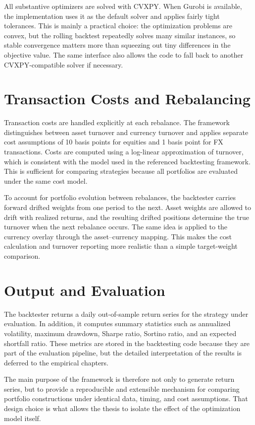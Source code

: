 All substantive optimizers are solved with CVXPY. When Gurobi is available, the implementation uses it as the default solver and applies fairly tight tolerances. This is mainly a practical choice: the optimization problems are convex, but the rolling backtest repeatedly solves many similar instances, so stable convergence matters more than squeezing out tiny differences in the objective value. The same interface also allows the code to fall back to another CVXPY-compatible solver if necessary.

\section{Transaction Costs and Rebalancing}

Transaction costs are handled explicitly at each rebalance. The framework distinguishes between asset turnover and currency turnover and applies separate cost assumptions of 10 basis points for equities and 1 basis point for FX transactions. Costs are computed using a log-linear approximation of turnover, which is consistent with the model used in the referenced backtesting framework. This is sufficient for comparing strategies because all portfolios are evaluated under the same cost model.

To account for portfolio evolution between rebalances, the backtester carries forward drifted weights from one period to the next. Asset weights are allowed to drift with realized returns, and the resulting drifted positions determine the true turnover when the next rebalance occurs. The same idea is applied to the currency overlay through the asset--currency mapping. This makes the cost calculation and turnover reporting more realistic than a simple target-weight comparison.

\section{Output and Evaluation}

The backtester returns a daily out-of-sample return series for the strategy under evaluation. In addition, it computes summary statistics such as annualized volatility, maximum drawdown, Sharpe ratio, Sortino ratio, and an expected shortfall ratio. These metrics are stored in the backtesting code because they are part of the evaluation pipeline, but the detailed interpretation of the results is deferred to the empirical chapters.

The main purpose of the framework is therefore not only to generate return series, but to provide a reproducible and extensible mechanism for comparing portfolio constructions under identical data, timing, and cost assumptions. That design choice is what allows the thesis to isolate the effect of the optimization model itself.